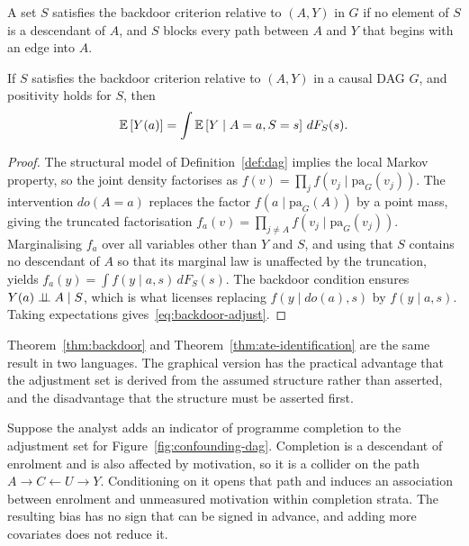 \begin{definition}
\label{def:backdoor}
A set $S$ satisfies the backdoor criterion relative to $(A, Y)$ in $G$ if no
element of $S$ is a descendant of $A$, and $S$ blocks every path between $A$ and
$Y$ that begins with an edge into $A$.
\end{definition}

\begin{theorem}
\label{thm:backdoor}
If $S$ satisfies the backdoor criterion relative to $(A,Y)$ in a causal DAG $G$,
and positivity holds for $S$, then
\begin{equation}
  \mathbb{E}\left[ Y(a) \right] = \int \mathbb{E}\left[ Y \mid A = a, S = s \right] \, dF_S(s).
  \label{eq:backdoor-adjust}
\end{equation}
\end{theorem}

\begin{proof}
The structural model of Definition~\ref{def:dag} implies the local Markov
property, so the joint density factorises as
$f(v) = \prod_j f\left( v_j \mid \mathrm{pa}_G(v_j) \right)$. The intervention
$do(A = a)$ replaces the factor $f(a \mid \mathrm{pa}_G(A))$ by a point mass,
giving the truncated factorisation
$f_a(v) = \prod_{j \neq A} f\left( v_j \mid \mathrm{pa}_G(v_j) \right)$.
Marginalising $f_a$ over all variables other than $Y$ and $S$, and using that
$S$ contains no descendant of $A$ so that its marginal law is unaffected by the
truncation, yields $f_a(y) = \int f(y \mid a, s) \, dF_S(s)$. The backdoor
condition ensures $Y(a) \perp\!\!\!\perp A \mid S$, which is what licenses replacing
$f(y \mid do(a), s)$ by $f(y \mid a, s)$. Taking expectations
gives~\eqref{eq:backdoor-adjust}.
\end{proof}

Theorem~\ref{thm:backdoor} and Theorem~\ref{thm:ate-identification} are the same
result in two languages. The graphical version has the practical advantage that
the adjustment set is derived from the assumed structure rather than asserted,
and the disadvantage that the structure must be asserted first.

\begin{example}
\label{ex:collider}
Suppose the analyst adds an indicator of programme completion to the adjustment
set for Figure~\ref{fig:confounding-dag}. Completion is a descendant of
enrolment and is also affected by motivation, so it is a collider on the path
$A \to C \leftarrow U \to Y$. Conditioning on it opens that path and induces an
association between enrolment and unmeasured motivation within completion
strata. The resulting bias has no sign that can be signed in advance, and adding
more covariates does not reduce it.
\end{example}

